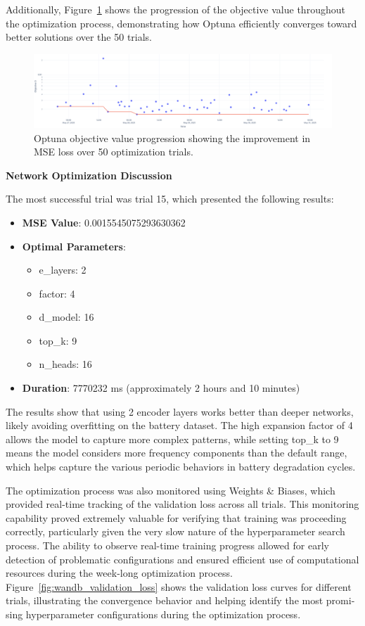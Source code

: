 Additionally, Figure~\ref{fig:optuna_objective} shows the progression of the objective value throughout the optimization process, demonstrating how Optuna efficiently converges toward better solutions over the 50 trials.

\begin{figure}[htbp]
    \centering
    \includegraphics[width=1\textwidth]{imgs/optuna_objective_plot.png}
    \caption{Optuna objective value progression showing the improvement in MSE loss over 50 optimization trials.}
    \label{fig:optuna_objective}
\end{figure}

\textbf{Network Optimization Discussion}
\label{subsec:best_trial_results}

The most successful trial was trial 15, which presented the following results:

\begin{itemize}
    \item \textbf{MSE Value}: 0.0015545075293630362
    \item \textbf{Optimal Parameters}:
    \begin{itemize}
        \item e\_layers: 2
        \item factor: 4  
        \item d\_model: 16
        \item top\_k: 9
        \item n\_heads: 16
    \end{itemize}
    \item \textbf{Duration}: 7770232 ms (approximately 2 hours and 10 minutes)
\end{itemize}

The results show that using 2 encoder layers works better than deeper networks, likely avoiding overfitting on the battery dataset. The high expansion factor of 4 allows the model to capture more complex patterns, while setting top\_k to 9 means the model considers more frequency components than the default range, which helps capture the various periodic behaviors in battery degradation cycles.

The optimization process was also monitored using Weights \& Biases, which provided real-time tracking of the validation loss across all trials. This monitoring capability proved extremely valuable for verifying that training was proceeding correctly, particularly given the very slow nature of the hyperparameter search process. The ability to observe real-time training progress allowed for early detection of problematic configurations and ensured efficient use of computational resources during the week-long optimization process. Figure~\ref{fig:wandb_validation_loss} shows the validation loss curves for different trials, illustrating the convergence behavior and helping identify the most promi-sing hyperparameter configurations during the optimization process.

